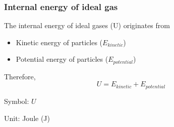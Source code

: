 \documentclass[t,aspectratio=169]{beamer}
\begin{document}

\begin{frame}%
\frametitle{Internal energy of ideal gas}

The internal energy of ideal gases (U) originates from

\begin{itemize}
\item Kinetic energy of particles ($E_{kinetic}$)
\item Potential energy of particles ($E_{potential}$)
\end{itemize}

Therefore,
$$U = E_{kinetic} + E_{potential}$$

Symbol: $U$

Unit: Joule (J)

\end{frame}

\end{document}
